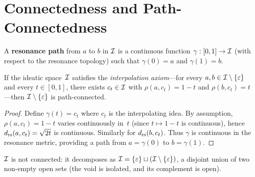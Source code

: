 \section{Connectedness and Path-Connectedness}
\label{sec:connectedness}

\begin{definition}
\label{def:resonance-path}
A \textbf{resonance path} from $a$ to $b$ in $\mathcal{I}$ is a
continuous function $\gamma : [0,1] \to \mathcal{I}$ (with respect to the
resonance topology) such that $\gamma(0) = a$ and $\gamma(1) = b$.
\end{definition}

\begin{theorem}
\label{thm:path-connected}
If the ideatic space~$\mathcal{I}$ satisfies the \emph{interpolation
axiom}---for every $a,b \in \mathcal{I} \setminus \{\varepsilon\}$ and every
$t \in [0,1]$, there exists $c_t \in \mathcal{I}$ with
$\rho(a,c_t) = 1-t$ and $\rho(b,c_t) = t$---then
$\mathcal{I} \setminus \{\varepsilon\}$ is path-connected.
\end{theorem}

\begin{proof}
Define $\gamma(t) = c_t$ where $c_t$ is the interpolating idea.
By assumption, $\rho(a,c_t) = 1-t$ varies continuously in~$t$
(since $t \mapsto 1-t$ is continuous), hence
$d_{\mathrm{rs}}(a,c_t) = \sqrt{2t}$ is continuous.  Similarly for
$d_{\mathrm{rs}}(b,c_t)$.  Thus $\gamma$ is continuous in the resonance
metric, providing a path from $a = \gamma(0)$ to $b = \gamma(1)$.
\end{proof}

\begin{corollary}
$\mathcal{I}$ is not connected: it decomposes as $\mathcal{I} = \{\varepsilon\}
\sqcup (\mathcal{I} \setminus \{\varepsilon\})$, a disjoint union of two
non-empty open sets (the void is isolated, and its complement
is open).
\end{corollary}

